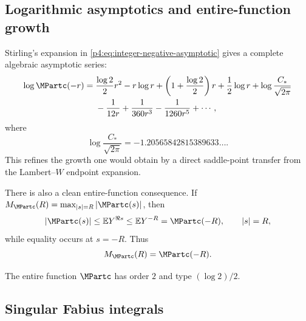 \documentclass[11pt,oneside]{article}
\theoremstyle{definition}
\theoremstyle{remark}
\newcommand{\E}{\mathbb E}
\newcommand{\1}{\mathbf 1}
\begin{document}
\subsection{Logarithmic asymptotics and entire-function growth}

Stirling's expansion in \cref{p4:eq:integer-negative-asymptotic} gives a complete
algebraic asymptotic series:
\begin{align}
 \log\MPartc(-r)
 ={}&\frac{\log2}{2}r^2-r\log r
 +\left(1+\frac{\log2}{2}\right)r
 +\frac12\log r
 +\log\frac{C_*}{\sqrt{2\pi}}
 \nonumber\\
 &-\frac1{12r}+\frac1{360r^3}-\frac1{1260r^5}+\cdots,
 \label{p4:eq:log-negative-asymptotic}
\end{align}
where
\begin{equation}\label{p4:eq:log-Cstar-numeric}
 \log\frac{C_*}{\sqrt{2\pi}}
 =-1.20565842815389633\ldots.
\end{equation}
This refines the growth one would obtain by a direct saddle-point transfer from the
Lambert--\(W\) endpoint expansion.

There is also a clean entire-function consequence.  If
\(M_{\MPartc}(R)=\max_{|s|=R}|\MPartc(s)|\), then
\begin{equation}\label{p4:eq:maxmod-equality}
 |\MPartc(s)|\le\E Y^{\Re s}\le\E Y^{-R}=\MPartc(-R),
 \qquad |s|=R,
\end{equation}
while equality occurs at \(s=-R\).  Thus
\begin{equation}\label{p4:eq:maxmod-exact}
 M_{\MPartc}(R)=\MPartc(-R).
\end{equation}

\begin{corollary}\label{p4:cor:order-type}
The entire function \(\MPartc\) has order \(2\) and type \((\log2)/2\).
\end{corollary}

\subsection{Singular Fabius integrals}
\end{document}
